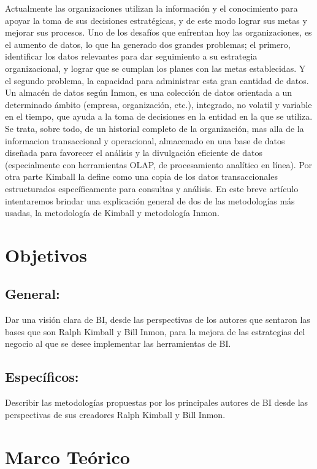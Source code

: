 \documentclass[%
 reprint,
 amsmath,amssymb,
 aps,
]{revtex4-1}
\begin{document}
Actualmente las organizaciones utilizan la información y el conocimiento para apoyar la toma de sus decisiones estratégicas, y de este modo lograr sus metas y mejorar sus procesos.
Uno de los desafíos que enfrentan hoy las organizaciones, es el aumento de datos, lo que ha generado dos grandes problemas; el primero, identificar los datos relevantes para dar seguimiento a su estrategia organizacional, y lograr que se cumplan los planes con las metas establecidas.
 Y el segundo problema, la capacidad para administrar esta gran cantidad de datos.
Un almacén de datos  según Inmon, es una colección de datos orientada a un determinado ámbito (empresa, organización, etc.), integrado, no volatil y variable en el tiempo, que ayuda a la toma de decisiones en la entidad en la que se utiliza. 
Se trata, sobre todo, de un historial completo de la organización, mas alla de la informacion transaccional y operacional, almacenado en una base de datos diseñada para favorecer el análisis y la divulgación eficiente de datos (especialmente con herramientas OLAP, de procesamiento analítico en línea). Por otra parte Kimball la define como una copia de los datos transaccionales estructurados específicamente para consultas y análisis. 
En este breve artículo intentaremos brindar una explicación general de dos de las metodologías más usadas, la metodología de Kimball y metodología Inmon.
\section{Objetivos}\label{sec:2}
\subsection{General:}
Dar una visión clara de BI, desde las perspectivas de los autores que sentaron las bases que son Ralph Kimball y Bill Inmon, para la mejora de las estrategias del negocio al que se desee implementar las herramientas de BI.
\subsection{Específicos:}
 Describir las metodologías propuestas por los principales autores de BI desde las perspectivas de sus creadores Ralph Kimball y Bill Inmon.


\section {Marco Teórico}
\end{document}

